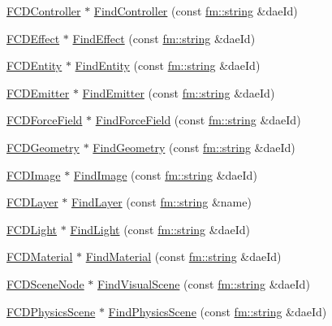 \begin{DoxyCompactItemize}
\item 
\hyperlink{classFCDController}{FCDController} $\ast$ \hyperlink{classFCDocument_a000167d8c0ae8c882112646df535d4de}{FindController} (const \hyperlink{classfm_1_1stringT}{fm::string} \&daeId)
\item 
\hyperlink{classFCDEffect}{FCDEffect} $\ast$ \hyperlink{classFCDocument_a79375a949976744e44ec862dd4a40691}{FindEffect} (const \hyperlink{classfm_1_1stringT}{fm::string} \&daeId)
\item 
\hyperlink{classFCDEntity}{FCDEntity} $\ast$ \hyperlink{classFCDocument_a15979aa2aa0eca88f2e73439e127b93c}{FindEntity} (const \hyperlink{classfm_1_1stringT}{fm::string} \&daeId)
\item 
\hyperlink{classFCDEmitter}{FCDEmitter} $\ast$ \hyperlink{classFCDocument_ac8d261077cde26a99a1ce3b772b07e53}{FindEmitter} (const \hyperlink{classfm_1_1stringT}{fm::string} \&daeId)
\item 
\hyperlink{classFCDForceField}{FCDForceField} $\ast$ \hyperlink{classFCDocument_ae23ddbb8be0fe6d1a5281bb86a348d55}{FindForceField} (const \hyperlink{classfm_1_1stringT}{fm::string} \&daeId)
\item 
\hyperlink{classFCDGeometry}{FCDGeometry} $\ast$ \hyperlink{classFCDocument_aba0a75e3cdcf0519c46359e6c00ca016}{FindGeometry} (const \hyperlink{classfm_1_1stringT}{fm::string} \&daeId)
\item 
\hyperlink{classFCDImage}{FCDImage} $\ast$ \hyperlink{classFCDocument_a765e299afb53dc8121a35e199e376c3b}{FindImage} (const \hyperlink{classfm_1_1stringT}{fm::string} \&daeId)
\item 
\hyperlink{classFCDLayer}{FCDLayer} $\ast$ \hyperlink{classFCDocument_a9e6f5bc687c368479f0b51cb8ac51018}{FindLayer} (const \hyperlink{classfm_1_1stringT}{fm::string} \&name)
\item 
\hyperlink{classFCDLight}{FCDLight} $\ast$ \hyperlink{classFCDocument_a8138a1308f79b1a21659af0931dcd3f5}{FindLight} (const \hyperlink{classfm_1_1stringT}{fm::string} \&daeId)
\item 
\hyperlink{classFCDMaterial}{FCDMaterial} $\ast$ \hyperlink{classFCDocument_a3a3c3223c7695facea54218afaf9a6b8}{FindMaterial} (const \hyperlink{classfm_1_1stringT}{fm::string} \&daeId)
\item 
\hyperlink{classFCDSceneNode}{FCDSceneNode} $\ast$ \hyperlink{classFCDocument_a305ad2a89cf7311bcad405912f0a55e8}{FindVisualScene} (const \hyperlink{classfm_1_1stringT}{fm::string} \&daeId)
\item 
\hyperlink{classFCDPhysicsScene}{FCDPhysicsScene} $\ast$ \hyperlink{classFCDocument_ab16b1f391d47e1810518d6a928c5c195}{FindPhysicsScene} (const \hyperlink{classfm_1_1stringT}{fm::string} \&daeId)

\end{DoxyCompactItemize}
